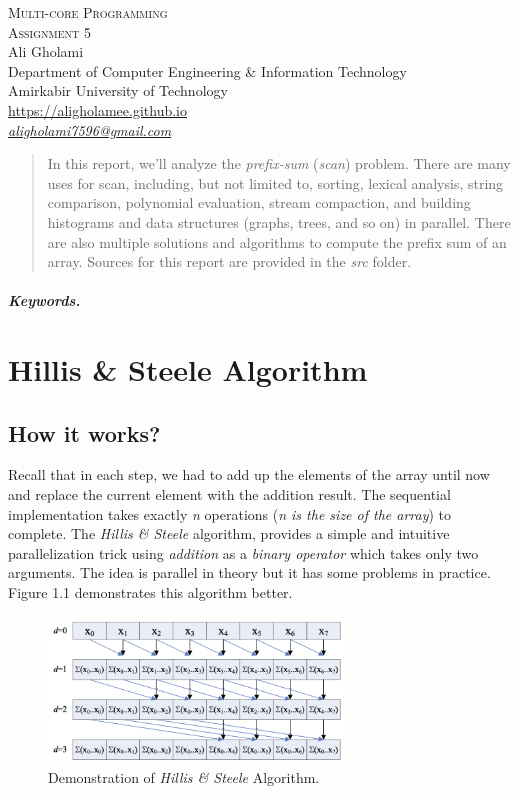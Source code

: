 \documentclass[12pt]{article}
\numberwithin{equation}{section}
\numberwithin{table}{section}
\numberwithin{figure}{section}
\begin{document}

\begin{center}
\textsc{\Huge Multi-core Programming} \\[2pt]
	\textsc{\Large Assignment 5}\\
	\vspace{0.5cm}
  Ali Gholami \\[6pt]
  Department of Computer Engineering \& Information Technology\\
  Amirkabir University of Technology  \\[6pt]
  \def\UrlFont{\em}
  \url{https://aligholamee.github.io}\\
\href{mailto:aligholami7596@gmail.com}{\textit{aligholami7596@gmail.com}}
\end{center}

\begin{abstract}
In this report, we'll analyze the \textit{prefix-sum} (\textit{scan}) problem. There are many uses for scan, including, but not limited to, sorting, lexical analysis, string comparison, polynomial evaluation, stream compaction, and building histograms and data structures (graphs, trees, and so on) in parallel. There are also multiple solutions and algorithms to compute the prefix sum of an array. Sources for this report are provided in the \textit{src} folder. 
\end{abstract} 

\subparagraph{Keywords.} \textit{}

\section{Hillis \& Steele Algorithm}
\subsection{How it works?}
Recall that in each step, we had to add up the elements of the array until now and replace the current element with the addition result. The sequential implementation takes exactly \textit{n} operations (\textit{n is the size of the array}) to complete. The \textit{Hillis \& Steele} algorithm, provides a simple and intuitive parallelization trick using \textit{addition} as a \textit{binary operator} which takes only two arguments. The idea is parallel in theory but it has some problems in practice. Figure 1.1 demonstrates this algorithm better.
\begin{figure}[!h]\centering
	\includegraphics[width=0.7\textwidth]{1_1.png}
	\caption{Demonstration of \textit{Hillis \& Steele} Algorithm.}
	\label{pl1}
\end{figure}
\end{document}
